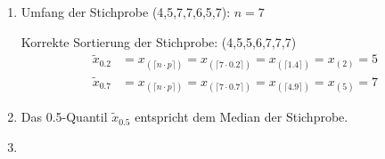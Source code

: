 \documentclass[a4paper]{scrartcl}
\def \blattnr {6}
\begin{document}
\begin{enumerate}[label=\bfseries \blattnr.\arabic*]
\begin{enumerate}
 \item
    Umfang der Stichprobe (4,5,7,7,6,5,7): $n=7$

    Korrekte Sortierung der Stichprobe: (4,5,5,6,7,7,7)
    \begin{align*}
        \tilde x_{\num{0.2}}
        &= x_{(\lceil n \cdot p \rceil)}
        = x_{(\lceil 7 \cdot 0.2 \rceil)}
        = x_{(\lceil 1.4 \rceil)}
        = x_{(2)} = 5 \\
        \tilde x_{0.7}
        &= x_{(\lceil n \cdot p \rceil)}
        = x_{(\lceil 7 \cdot 0.7 \rceil)}
        = x_{(\lceil 4.9 \rceil)}
        = x_{(5)} = 7
    \end{align*}

 \item
     Das \num{0,5}-Quantil $\tilde x_{\num{0,5}}$ entspricht dem Median der Stichprobe.


    \item


\end{enumerate}
\end{enumerate}
\end{document}
